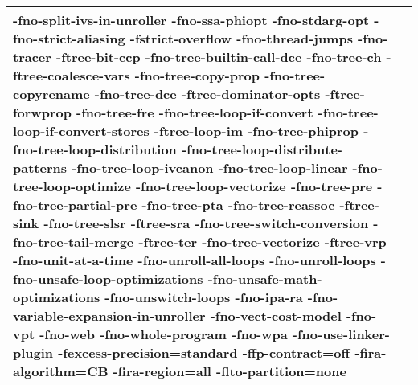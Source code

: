 \begin{tabular}{|l|p{6.2in}|}
-fno-split-ivs-in-unroller -fno-ssa-phiopt -fno-stdarg-opt -fno-strict-aliasing \textbf{-fstrict-overflow} -fno-thread-jumps -fno-tracer \textbf{-ftree-bit-ccp} -fno-tree-builtin-call-dce -fno-tree-ch \textbf{-ftree-coalesce-vars} -fno-tree-copy-prop -fno-tree-copyrename -fno-tree-dce \textbf{-ftree-dominator-opts} \textbf{-ftree-forwprop} -fno-tree-fre -fno-tree-loop-if-convert -fno-tree-loop-if-convert-stores \textbf{-ftree-loop-im} -fno-tree-phiprop -fno-tree-loop-distribution -fno-tree-loop-distribute-patterns -fno-tree-loop-ivcanon -fno-tree-loop-linear -fno-tree-loop-optimize -fno-tree-loop-vectorize -fno-tree-pre -fno-tree-partial-pre -fno-tree-pta -fno-tree-reassoc \textbf{-ftree-sink} -fno-tree-slsr \textbf{-ftree-sra} -fno-tree-switch-conversion -fno-tree-tail-merge \textbf{-ftree-ter} -fno-tree-vectorize \textbf{-ftree-vrp} -fno-unit-at-a-time -fno-unroll-all-loops -fno-unroll-loops -fno-unsafe-loop-optimizations -fno-unsafe-math-optimizations -fno-unswitch-loops -fno-ipa-ra -fno-variable-expansion-in-unroller -fno-vect-cost-model -fno-vpt -fno-web -fno-whole-program -fno-wpa -fno-use-linker-plugin \textbf{-fexcess-precision=standard} \textbf{-ffp-contract=off} \textbf{-fira-algorithm=CB} \textbf{-fira-region=all} \textbf{-flto-partition=none} }\\
     \hline
    \end{tabular}    